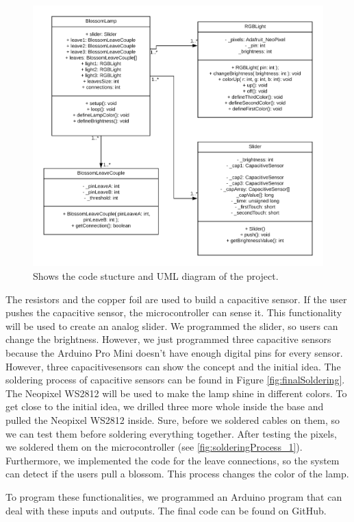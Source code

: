 \documentclass[04_projectProcess.tex]{subfiles}
\begin{document}
\begin{flushleft}
        \begin{figure}[H]
            \centering
            \includegraphics[width=0.8\linewidth]{images/programmingProcess/BlossomLamp_UML.png}
            \caption{Shows the code stucture and UML diagram of the project.}
            \label{fig:UMLDiagram}
        \end{figure}

        \noindent
        The resistors and the copper foil are used to build a capacitive sensor. \cite{Badger2019} 
        If the user pushes the capacitive sensor, the microcontroller can sense it. This functionality
        will be used to create an analog slider. We programmed the slider, so users can change the 
        brightness. However, we just programmed three capacitive sensors because the Arduino Pro Mini 
        doesn't have enough digital pins for every sensor. However, three capacitivesensors can show 
        the concept and the initial idea. The soldering process of capacitive sensors can be found in 
        Figure \ref{fig:finalSoldering}. \\
        \noindent
        The Neopixel WS2812 will be used to make the lamp shine in different colors. \cite{Burgess2019} 
        To get close to the initial idea, we drilled three more whole inside the base and 
        pulled the Neopixel WS2812 inside. Sure, before we soldered cables on them, so we can 
        test them before soldering everything together. After testing the pixels, we soldered 
        them on the microcontroller (see \ref{fig:solderingProcess_1}).\\
        Furthermore, we implemented the code for the leave connections, so the system can detect if 
        the users pull a blossom. This process changes the color of the lamp.
    \end{flushleft}


    \noindent
    To program these functionalities, we programmed an Arduino program that can deal with these inputs 
    and outputs. The final code can be found on GitHub. %
\end{document}
